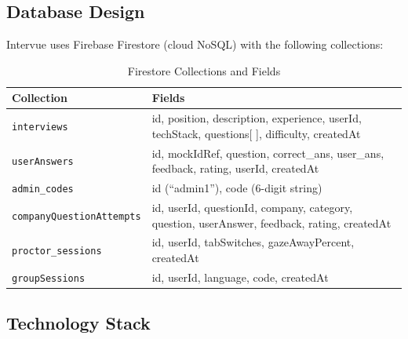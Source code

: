 \subsection{Database Design}
Intervue uses Firebase Firestore (cloud NoSQL) with the following collections:

\begin{table}[h!]
\centering
\caption{Firestore Collections and Fields}
\begin{tabular}{|p{3.5cm}|p{9cm}|}
\hline
\textbf{Collection} & \textbf{Fields} \\
\hline
\texttt{interviews} & id, position, description, experience, userId, techStack, questions[ ], difficulty, createdAt \\
\hline
\texttt{userAnswers} & id, mockIdRef, question, correct\_ans, user\_ans, feedback, rating, userId, createdAt \\
\hline
\texttt{admin\_codes} & id (``admin1''), code (6-digit string) \\
\hline
\texttt{companyQuestionAttempts} & id, userId, questionId, company, category, question, userAnswer, feedback, rating, createdAt \\
\hline
\texttt{proctor\_sessions} & id, userId, tabSwitches, gazeAwayPercent, createdAt \\
\hline
\texttt{groupSessions} & id, userId, language, code, createdAt \\
\hline
\end{tabular}
\end{table}

\subsection{Technology Stack}

